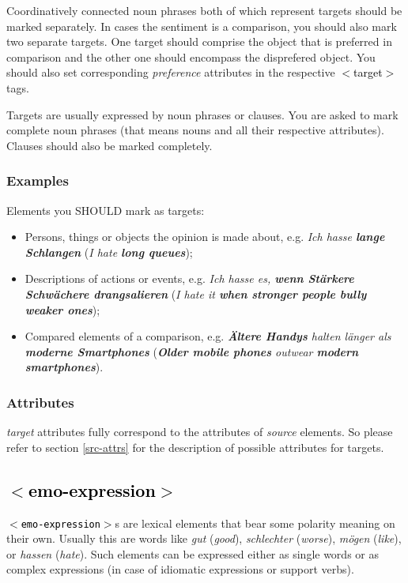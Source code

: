\documentclass[11pt,a4paper]{article}
\newcommand{\xmltag}[1]{\textcolor{black}{{\small$<$#1$>$}}}
\begin{document}
Coordinatively connected noun phrases both of which represent targets
should be marked separately. In cases the sentiment is a comparison,
you should also mark two separate targets. One target should comprise
the object that is preferred in comparison and the other one should encompass the disprefered object. You should also set corresponding
\textit{preference} attributes in the respective \xmltag{target} tags.

Targets are usually expressed by noun phrases or clauses. You are
asked to mark complete noun phrases (that means nouns and all their
respective attributes). Clauses should also be marked completely.

\subsubsection{Examples}
Elements you SHOULD mark as targets:
\begin{itemize}
  \item Persons, things or objects the opinion is made about,
    e.g. \textit{Ich hasse \textbf{lange Schlangen}} (\textit{I hate
      \textbf{long queues}});

  \item Descriptions of actions or events, e.g. \textit{Ich hasse es,
    \textbf{wenn St\"arkere Schw\"achere drangsalieren}} (\textit{I
    hate it \textbf{when stronger people bully weaker ones}});

  \item Compared elements of a comparison,
    e.g. \textit{\textbf{\"Altere Handys} halten l\"anger als
      \textbf{moderne Smartphones}} (\textit{\textbf{Older mobile
        phones} outwear \textbf{modern smartphones}}).
\end{itemize}

\subsubsection{Attributes}
\textit{target} attributes fully correspond to the attributes of
\textit{source} elements. So please refer to section \ref{src-attrs} for the description of possible attributes for targets.

\subsection{\xmltag{emo-expression}}
\texttt{\xmltag{emo-expression}}s are lexical elements that bear some
polarity meaning on their own. Usually this are words like
\textit{gut} (\textit{good}), \textit{schlechter} (\textit{worse}),
\textit{m\"ogen} (\textit{like}), or \textit{hassen}
(\textit{hate}). Such elements can be expressed either as single words
or as complex expressions (in case of idiomatic expressions or support
verbs).
\end{document}
